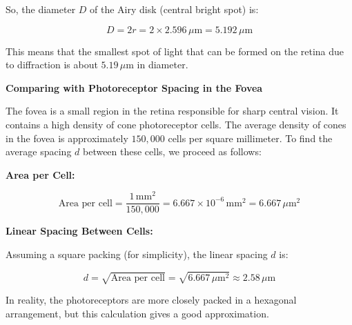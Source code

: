 \documentclass[
  a4paper,
]{book}
\begin{document}
So, the diameter \(D\) of the Airy disk (central bright spot) is:

\[
D = 2r = 2 \times 2.596\, \mu\text{m} = 5.192\, \mu\text{m}
\]

This means that the smallest spot of light that can be formed on the
retina due to diffraction is about \(5.19\, \mu\text{m}\) in diameter.

\textbf{Comparing with Photoreceptor Spacing in the Fovea}

The fovea is a small region in the retina responsible for sharp central
vision. It contains a high density of cone photoreceptor cells. The
average density of cones in the fovea is approximately \(150,000\) cells
per square millimeter. To find the average spacing \(d\) between these
cells, we proceed as follows:

\textbf{Area per Cell:}

\[
   \text{Area per cell} = \frac{1\, \text{mm}^2}{150,000} = 6.667 \times 10^{-6}\, \text{mm}^2 = 6.667\, \mu\text{m}^2
   \]

\textbf{Linear Spacing Between Cells:}

Assuming a square packing (for simplicity), the linear spacing \(d\) is:

\[
   d = \sqrt{\text{Area per cell}} = \sqrt{6.667\, \mu\text{m}^2} \approx 2.58\, \mu\text{m}
   \]

In reality, the photoreceptors are more closely packed in a hexagonal
arrangement, but this calculation gives a good approximation.
\end{document}

